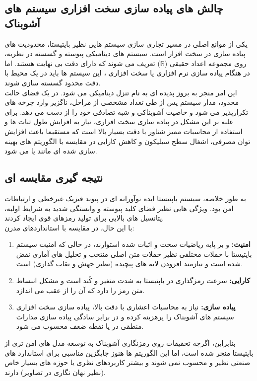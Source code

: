 \documentclass[12pt]{report}
\begin{document}
\newpage

\subsection{چالش های پیاده سازی سخت افزاری سیستم های آشوبناک}
یکی از موانع اصلی در مسیر تجاری سازی سیستم هایی نظیر باپتیستا، محدودیت های پیاده سازی در سخت افزار 
است. سیستم های دینامیکی پیوسته و گسسته در نظریه، روی مجموعه اعداد حقیقی ($\mathbb{R}$) تعریف 
می شوند که دارای دقت بی نهایت هستند. اما در هنگام پیاده سازی نرم افزاری یا سخت افزاری
، این سیستم ها باید در یک محیط با دقت محدود
 گسسته سازی شوند. 
\\\noindent
این امر منجر به بروز پدیده ای به نام تنزل دینامیکی 
می شود. در یک فضای حالت محدود، مدار سیستم پس از طی تعداد مشخصی از مراحل، ناگزیر وارد چرخه های 
تکرارپذیر می شود و خاصیت آشوبناکی و شبه تصادفی خود را از دست می دهد. 
برای غلبه بر این مشکل در پیاده سازی سخت افزاری، نیاز به افزایش طول ثبات ها 
و استفاده از محاسبات ممیز شناور با دقت بسیار بالا است که مستقیما باعث افزایش توان مصرفی، اشغال 
سطح سیلیکون و کاهش کارایی در مقایسه با الگوریتم های بهینه سازی شده ای مانند  یا  
می شود.

\subsection{نتیجه گیری مقایسه ای}
به طور خلاصه، سیستم باپتیستا ایده نوآورانه ای در پیوند فیزیک غیرخطی و ارتباطات امن بود. ویژگی هایی 
نظیر فضای کلید پیوسته و وابستگی شدید به شرایط اولیه، پتانسیل های بالایی برای تولید رمزهای قوی 
ایجاد کردند. 
\\\noindent
با این حال، در مقایسه با استانداردهای مدرن:
\begin{enumerate}[leftmargin=*]
    \item \textbf{امنیت:}  و  بر پایه ریاضیات سخت و اثبات شده استوارند، در حالی که 
    امنیت سیستم باپتیستا با حملات مختلفی نظیر حملات متن اصلی منتخب و تحلیل های آماری نقض شده است 
    و نیازمند افزودن لایه های پیچیده (نظیر جهش و نقاب گذاری) است.
    \item \textbf{کارایی:} سرعت رمزگذاری در باپتیستا به شدت متغیر و کُند است و مشکل انبساط متن 
    رمز را دارد که آن را از  عقب می اندازد.
    \item \textbf{پیاده سازی:} نیاز به محاسبات اعشاری با دقت بالا، پیاده سازی سخت افزاری سیستم های 
    آشوبناک را پرهزینه کرده و در برابر سادگی پیاده سازی مدارات منطقی در  یا  نقطه 
    ضعف محسوب می شود.
\end{enumerate}
بنابراین، اگرچه تحقیقات روی رمزنگاری آشوبناک به توسعه مدل های امن تری از باپتیستا منجر شده است، 
اما این الگوریتم ها هنوز جایگزین مناسبی برای استاندارد های صنعتی نظیر  و  
محسوب نمی شوند و بیشتر کاربردهای نظری یا حوزه های بسیار خاص (نظیر نهان نگاری در تصاویر) دارند.
\end{document}
